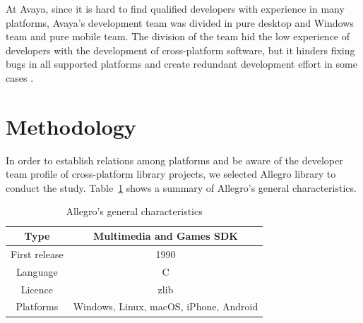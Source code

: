 \documentclass[10pt, conference]{IEEEtran}
\begin{document}

At Avaya, since it is hard to find qualified developers with experience in many platforms, Avaya's development team  was divided in pure desktop and Windows team and pure mobile team. The division of the team hid the low experience of developers with the development of cross-platform software, but it hinders fixing bugs in all supported platforms and create redundant development effort in some cases \cite{Duc2014}.  %





\section{Methodology}
\label{methodology}

In order to establish relations among platforms and be aware of the developer team profile of cross-platform library projects, we selected Allegro library to conduct the study. Table~\ref{allegrogeneral} shows a summary of Allegro's general characteristics.  

\begin{table}[h]
\renewcommand{\arraystretch}{1.3}
\caption{Allegro's general characteristics}
\label{allegrogeneral}
\centering

\begin{tabular}{|c|c|}
\hline
Type & Multimedia and Games SDK \\
\hline
First release & 1990 \\
\hline
Language & C \\
\hline
Licence & zlib \\
\hline
Platforms & Windows, Linux, macOS, iPhone, Android \\
\hline
\end{tabular}
\end{table}
\end{document}
